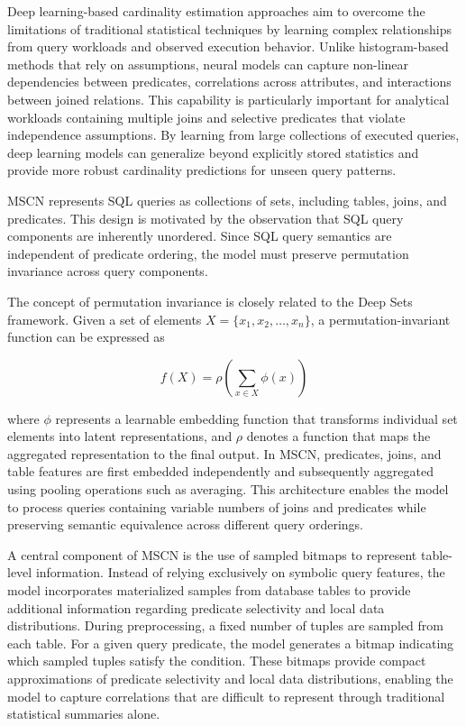 Deep learning-based cardinality estimation approaches aim to overcome the limitations of traditional statistical techniques by learning complex relationships from query workloads and observed execution behavior\cite{10.1145/3725355}\cite{10.14778/3750601.3750699}. Unlike histogram-based methods that rely on assumptions, neural models can capture non-linear dependencies between predicates, correlations across attributes, and interactions between joined relations. This capability is particularly important for analytical workloads containing multiple joins and selective predicates that violate independence assumptions. By learning from large collections of executed queries, deep learning models can generalize beyond explicitly stored statistics and provide more robust cardinality predictions for unseen query patterns.

MSCN represents SQL queries as collections of sets, including tables, joins, and predicates. This design is motivated by the observation that SQL query components are inherently unordered. Since SQL query semantics are independent of predicate ordering, the model must preserve permutation invariance across query components.

The concept of permutation invariance is closely related to the Deep Sets framework. Given a set of elements $X = \{x_1, x_2, \dots, x_n\}$, a permutation-invariant function can be expressed as

\begin{equation}
f(X) = \rho \left( \sum_{x \in X} \phi(x) \right)
\end{equation}

where $\phi$ represents a learnable embedding function that transforms individual set elements into latent representations, and $\rho$ denotes a function that maps the aggregated representation to the final output. In MSCN, predicates, joins, and table features are first embedded independently and subsequently aggregated using pooling operations such as averaging. This architecture enables the model to process queries containing variable numbers of joins and predicates while preserving semantic equivalence across different query orderings.

A central component of MSCN is the use of sampled bitmaps to represent table-level information. Instead of relying exclusively on symbolic query features, the model incorporates materialized samples from database tables to provide additional information regarding predicate selectivity and local data distributions. During preprocessing, a fixed number of tuples are sampled from each table. For a given query predicate, the model generates a bitmap indicating which sampled tuples satisfy the condition. These bitmaps provide compact approximations of predicate selectivity and local data distributions, enabling the model to capture correlations that are difficult to represent through traditional statistical summaries alone.

